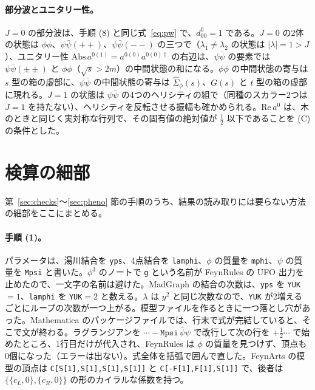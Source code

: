 \documentclass[a4paper,10pt]{ltjsarticle}
\begin{document}
\paragraph{部分波とユニタリー性。}$J=0$ の部分波は、手順 (8) と同じ式~\eqref{eq:pw} で、$d^0_{00}=1$ である。$J=0$ の2体の状態は $\phi\phi$、$\psi\bar\psi(++)$、$\psi\bar\psi(--)$ の三つで（$\lambda_1\ne\lambda_2$ の状態は $|\lambda|=1>J$）、ユニタリー性 $\mathrm{Abs}\,a^{0(1)}=a^{0(0)}a^{0(0)\dagger}$ の右辺は、$\psi\bar\psi$ の要素では $\psi\bar\psi(\pm\pm)$ と $\phi\phi$（$\sqrt s>2m$）の中間状態の和になる。$\phi\phi$ の中間状態の寄与は $s$ 型の箱の虚部に、$\psi\bar\psi$ の中間状態の寄与は $\hat\Sigma_\phi(s)$、$G(s)$ と $t$ 型の箱の虚部に現れる。$J=1$ の状態は $\psi\bar\psi$ の4つのヘリシティの組で（同種のスカラー2つは $J=1$ を持たない）、ヘリシティを反転させる振幅も確かめられる。$\mathrm{Re}\,a^0$ は、木のときと同じく実対称な行列で、その固有値の絶対値が $\frac12$ 以下であることを (C) の条件とした。

\section{検算の細部}\label{app:details}

第~\ref{sec:checks}〜\ref{sec:pheno} 節の手順のうち、結果の読み取りには要らない方法の細部をここにまとめる。

\paragraph{手順 (1)。}パラメータは、湯川結合を \texttt{yps}、4点結合を \texttt{lamphi}、$\phi$ の質量を \texttt{mphi}、$\psi$ の質量を \texttt{Mpsi} と書いた。$\phi^3$ のノートで \texttt{g} という名前が FeynRules の UFO 出力を止めたので、一文字の名前は避けた。MadGraph の結合の次数は、\texttt{yps} を \texttt{YUK}$=1$、\texttt{lamphi} を \texttt{YUK}$=2$ と数える。$\lambda$ は $y^2$ と同じ次数なので、\texttt{YUK} が2増えるごとにループの次数が一つ上がる。模型ファイルを作るときに一つ落とし穴があった。Mathematica のパッケージファイルでは、行末で式が完結していると、そこで文が終わる。ラグランジアンを $\cdots-\texttt{Mpsi}\,\bar\psi\psi$ で改行して次の行を $+\frac12\cdots$ で始めたところ、1行目だけが代入され、FeynRules は $\phi$ の質量を見つけず、頂点も0個になった（エラーは出ない）。式全体を括弧で囲んで直した。FeynArts の模型の頂点は \texttt{C[S[1],S[1],S[1],S[1]]} と \texttt{C[-F[1],F[1],S[1]]} で、後者は $\{\{c_L,0\},\{c_R,0\}\}$ の形のカイラルな係数を持つ。
\end{document}
